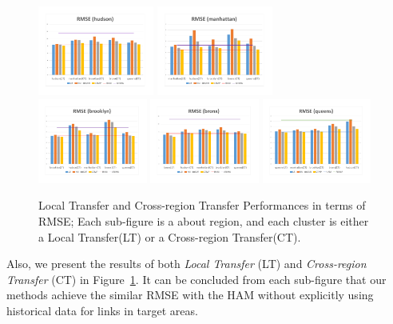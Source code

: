 \begin{figure}[th!]
	\centering
	\includegraphics[width=0.34\textwidth]{figures/1.pdf}
	\includegraphics[width=0.34\textwidth]{figures/2.pdf}
	\includegraphics[width=0.32\textwidth]{figures/3.pdf}
	\includegraphics[width=0.32\textwidth]{figures/4.pdf}
	\includegraphics[width=0.32\textwidth]{figures/5.pdf}
	\caption{Local Transfer and Cross-region Transfer Performances in terms of RMSE; Each sub-figure is a about region, and each cluster is either a Local Transfer(LT) or a Cross-region Transfer(CT).}
	\label{fig:transfer}
\end{figure}
Also, we present the results of both \textit{Local Transfer} (LT) and \textit{Cross-region Transfer} (CT) in Figure~\ref{fig:transfer}.
It can be concluded from each sub-figure that our methods achieve the similar RMSE with the HAM without explicitly using historical data for links in target areas.
